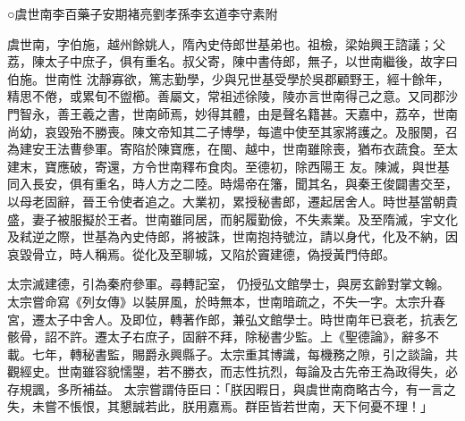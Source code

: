 
\begin{pinyinscope}

 ○虞世南李百藥子安期褚亮劉孝孫李玄道李守素附



 虞世南，字伯施，越州餘姚人，隋內史侍郎世基弟也。祖檢，梁始興王諮議；父荔，陳太子中庶子，俱有重名。叔父寄，陳中書侍郎，無子，以世南繼後，故字曰伯施。世南性
 沈靜寡欲，篤志勤學，少與兄世基受學於吳郡顧野王，經十餘年，精思不倦，或累旬不盥櫛。善屬文，常祖述徐陵，陵亦言世南得己之意。又同郡沙門智永，善王羲之書，世南師焉，妙得其體，由是聲名籍甚。天嘉中，荔卒，世南尚幼，哀毀殆不勝喪。陳文帝知其二子博學，每遣中使至其家將護之。及服闋，召為建安王法曹參軍。寄陷於陳寶應，在閩、越中，世南雖除喪，猶布衣蔬食。至太建末，寶應破，寄還，方令世南釋布食肉。至德初，除西陽王
 友。陳滅，與世基同入長安，俱有重名，時人方之二陸。時煬帝在籓，聞其名，與秦王俊闢書交至，以母老固辭，晉王令使者追之。大業初，累授秘書郎，遷起居舍人。時世基當朝貴盛，妻子被服擬於王者。世南雖同居，而躬履勤儉，不失素業。及至隋滅，宇文化及弒逆之際，世基為內史侍郎，將被誅，世南抱持號泣，請以身代，化及不納，因哀毀骨立，時人稱焉。從化及至聊城，又陷於竇建德，偽授黃門侍郎。



 太宗滅建德，引為秦府參軍。尋轉記室，
 仍授弘文館學士，與房玄齡對掌文翰。太宗嘗命寫《列女傳》以裝屏風，於時無本，世南暗疏之，不失一字。太宗升春宮，遷太子中舍人。及即位，轉著作郎，兼弘文館學士。時世南年已衰老，抗表乞骸骨，詔不許。遷太子右庶子，固辭不拜，除秘書少監。上《聖德論》，辭多不載。七年，轉秘書監，賜爵永興縣子。太宗重其博識，每機務之隙，引之談論，共觀經史。世南雖容貌懦曌，若不勝衣，而志性抗烈，每論及古先帝王為政得失，必存規諷，多所補益。
 太宗嘗謂侍臣曰：「朕因暇日，與虞世南商略古今，有一言之失，未嘗不悵恨，其懇誠若此，朕用嘉焉。群臣皆若世南，天下何憂不理！」




\end{pinyinscope}
